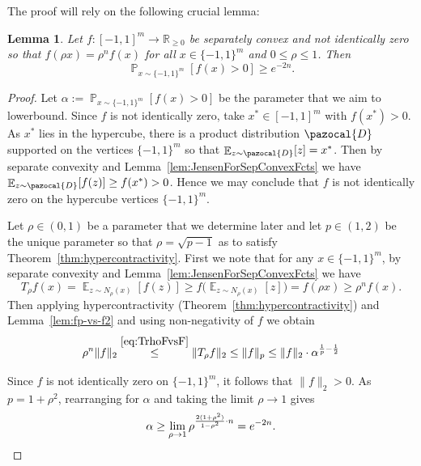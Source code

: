 \documentclass[12pt,english]{article}
\theoremstyle{theorem}
\newtheorem{lemma}[theorem]{Lemma}
\theoremstyle{remark}
\newcommand{\E}{\mathop{\mathbb{E}}}
\renewcommand{\Pr}{\mathop{\mathbb{P}}}
\begin{document}
The proof will rely on the following crucial lemma:

\begin{lemma}\label{lem:hyperhomog}
Let $f : [-1,1]^m \to \mathbb{R}_{\ge 0}$ be separately convex and not identically zero so that $f(\rho x) = \rho^n f(x)$ for all $x \in \{-1,1\}^m$ and $0 \leq \rho \leq 1$. Then \[ \Pr_{x \sim \{-1,1\}^m } [f(x) > 0] \ge e^{-2n}. \]
\end{lemma}

\begin{proof}
  Let $\alpha := \Pr_{x \sim \{ -1,1\}^m}[f(x) > 0]$ be the parameter that we aim to lowerbound.
  Since $f$ is not identically zero, take $x^* \in [-1,1]^m$ with $f(x^*) > 0$. As $x^*$ lies in the hypercube, there is a product distribution $\pazocal{D}$ supported on the vertices $\{ -1,1\}^m$ so that $\E_{z \sim \pazocal{D}}[z] = x^*$. Then by separate convexity and Lemma~\ref{lem:JensenForSepConvexFcts} we have $\E_{z \sim \pazocal{D}}[f(z)] \ge f(x^*) > 0$. Hence we may conclude that $f$ is not identically zero on the hypercube vertices $\{-1,1\}^m$.

  Let $\rho \in (0,1)$ be a parameter that we determine later and let $p \in (1,2)$ be the
  unique parameter so that $\rho = \sqrt{p-1}$ as to satisfy Theorem~\ref{thm:hypercontractivity}.
  First we note that for any $x \in \{-1,1\}^m$, by separate convexity and Lemma~\ref{lem:JensenForSepConvexFcts} we have  
  \begin{equation} \label{eq:TrhoFvsF}
    T_\rho f(x) = \E_{z \sim N_\rho (x)} [f(z)] \ge f\Big(\E_{z \sim N_\rho (x)} [z]\Big) = f(\rho x) \ge \rho^n f(x).
  \end{equation}
  Then applying hypercontractivity (Theorem~\ref{thm:hypercontractivity}) and Lemma~\ref{lem:fp-vs-f2}
  and using non-negativity of $f$ we obtain
  \[
\rho^n\|f\|_2  \stackrel{\eqref{eq:TrhoFvsF}}{\leq} \|T_{\rho}f\|_2 \leq  \|f\|_p \leq \|f\|_2 \cdot \alpha^{\frac{1}{p}-\frac{1}{2}}
  \]
  
  Since $f$ is not identically zero on $\{-1,1\}^m$, it follows that $\|f\|_2 > 0$. As $p = 1+\rho^2$,
  rearranging for $\alpha$ and taking the limit $\rho \to 1$ gives
  \[
   \alpha \geq \lim_{\rho \to 1} \rho^{\frac{2(1+\rho^2)}{1-\rho^2} \cdot n} = e^{-2n}. \qedhere
  \]
\end{proof}
\end{document}
